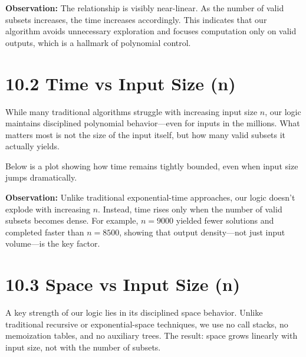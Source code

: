 \documentclass[11pt]{article}
\begin{document}
\textbf{Observation:} The relationship is visibly near-linear. As the number of valid subsets increases, the time increases accordingly. This indicates that our algorithm avoids unnecessary exploration and focuses computation only on valid outputs, which is a hallmark of polynomial control.

\section*{10.2 Time vs Input Size (n)}

While many traditional algorithms struggle with increasing input size \( n \), our logic maintains disciplined polynomial behavior—even for inputs in the millions. What matters most is not the size of the input itself, but how many valid subsets it actually yields.

Below is a plot showing how time remains tightly bounded, even when input size jumps dramatically.

\begin{center}
\end{center}

\textbf{Observation:} Unlike traditional exponential-time approaches, our logic doesn’t explode with increasing \( n \). Instead, time rises only when the number of valid subsets becomes dense. For example, \( n = 9000 \) yielded fewer solutions and completed faster than \( n = 8500 \), showing that output density—not just input volume—is the key factor.


\section*{10.3 Space vs Input Size (n)}

A key strength of our logic lies in its disciplined space behavior. Unlike traditional recursive or exponential-space techniques, we use no call stacks, no memoization tables, and no auxiliary trees. The result: space grows linearly with input size, not with the number of subsets.
\end{document}
